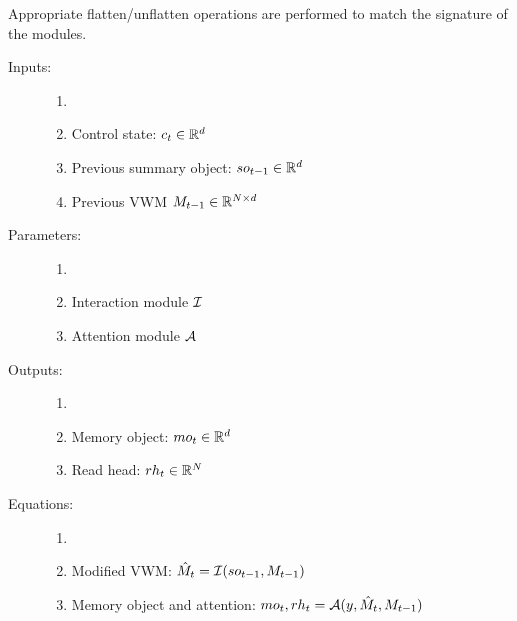 \begin{note}
	Appropriate flatten/unflatten operations are performed to match the signature 
	of the modules.
\end{note}




\begin{description}
	\item[Inputs:] 
	\begin{enumerate}
		\item[]
		\item Control state: $c_t \in \mathbb{R}^d$	
		\item Previous summary object: $so_{t-1} \in  \mathbb{R}^d$
		\item Previous VWM $M_{t-1} \in \mathbb{R}^{N \times d}$
	\end{enumerate}
	
	\item[Parameters:] 
	\begin{enumerate}
		\item[]
		\item Interaction module $\mathcal{I}$
		\item Attention module $\mathcal{A}$
	\end{enumerate}
	
	\item[Outputs:] 
	\begin{enumerate}
		\item[]
		\item Memory object: $mo_t \in \mathbb{R}^d$
		\item Read head: $rh_t \in \mathbb{R}^N$
	\end{enumerate}
	
	\item[Equations:]
	\begin{enumerate}
		\item[]
		\item Modified VWM: $\hat{M}_t = \mathcal{I}(so_{t-1}, M_{t-1})$
		\item Memory object and attention: $mo_t, rh_t = \mathcal{A}(y, \hat{M}_t, M_{t-1})$
	\end{enumerate}
\end{description}


